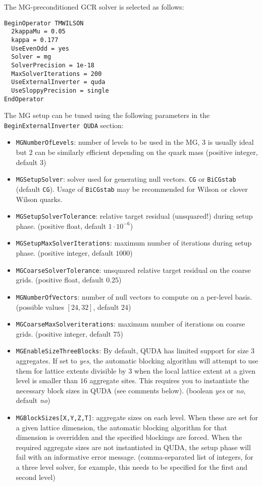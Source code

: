 The MG-preconditioned GCR solver is selected as follows:
\begin{verbatim}
BeginOperator TMWILSON
  2kappaMu = 0.05
  kappa = 0.177
  UseEvenOdd = yes
  Solver = mg
  SolverPrecision = 1e-18
  MaxSolverIterations = 200
  UseExternalInverter = quda
  UseSloppyPrecision = single
EndOperator
\end{verbatim}

The MG setup can be tuned using the following parameters in the \texttt{BeginExternalInverter QUDA} section:
\begin{itemize}
  \item{ \texttt{MGNumberOfLevels}: number of levels to be used in the MG, $3$ is usually ideal but $2$ can be similarly efficient depending on the quark mass (positive integer, default $3$) }
  \item{ \texttt{MGSetupSolver}: solver used for generating null vectors. \texttt{CG} or \texttt{BiCGstab} (default \texttt{CG}). Usage of \texttt{BiCGstab} may be recommended for Wilson or clover Wilson quarks. }
  \item{ \texttt{MGSetupSolverTolerance}: relative target residual (unsquared!) during setup phase. (positive float, default $1\cdot10^{-6}$) }
  \item{ \texttt{MGSetupMaxSolverIterations}: maximum number of iterations during setup phase. (positive integer, default $1000$) }
  \item{ \texttt{MGCoarseSolverTolerance}: unsquared relative target residual on the coarse grids. (positive float, default $0.25$) }
  \item{ \texttt{MGNumberOfVectors}: number of null vectors to compute on a per-level basis. (possible values $\left[ 24, 32 \right]$, default $24$)}
  \item{ \texttt{MGCoarseMaxSolveriterations}: maximum number of iterations on coarse grids. (positive integer, default $75$) }
  \item{ \texttt{MGEnableSizeThreeBlocks}: By default, QUDA has limited support for size $3$ aggregates. If set to \emph{yes}, the automatic blocking algorithm will attempt to use them for lattice extents divisible by $3$ when the local lattice extent at a given level is smaller than $16$ aggregate sites. This requires you to instantiate the necessary block sizes in QUDA (see comments below). (boolean \emph{yes} or \emph{no}, default \emph{no}) }
  \item{ \texttt{MGBlockSizes[X,Y,Z,T]}: aggregate sizes on each level. When these are set for a given lattice dimension, the automatic blocking algorithm for that dimension is overridden and the specified blockings are forced. When the required aggregate sizes are not instantiated in QUDA, the setup phase will fail with an informative error message. (comma-separated list of integers, for a three level solver, for example, this needs to be specified for the first and second level)} 

\end{itemize}

